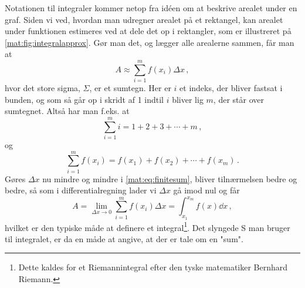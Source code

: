 Notationen til integraler kommer netop fra idéen om at beskrive arealet under en graf.
Siden vi ved, hvordan man udregner arealet på et rektangel, kan arealet under funktionen estimeres ved at dele det op i rektangler, som er illustreret på \cref{mat:fig:integralapprox}.
Gør man det, og lægger alle arealerne sammen, får man at
\begin{equation} \label{mat:eq:finitesum}
    A\approx \sum_{i=1}^mf(x_i)\Delta x \, ,
\end{equation}
hvor det store sigma, $\Sigma$, er et sumtegn. Her er $i$ et indeks, der bliver fastsat i bunden, og som så går op i skridt af 1 indtil $i$ bliver lig $m$, der står over sumtegnet. Altså har man f.eks. at
\begin{equation}
\sum_{i=1}^m i = 1+2+3+\cdots+m \,  ,    
\end{equation}
og
\begin{equation}
\sum_{i=1}^m f(x_i) = f(x_1)+f(x_2)+\cdots+f(x_m) \, .
\end{equation}
Gøres $\Delta x$ nu mindre og mindre i \cref{mat:eq:finitesum}, bliver tilnærmelsen bedre og bedre, så som i differentialregning lader vi $\Delta x$ gå imod nul og får
\begin{equation}
    A=\lim_{\Delta x\rightarrow 0}\sum_{i=1}^m f(x_i)\Delta x=\int_{x_1}^{x_m}f(x)\dd{x} \, ,
\end{equation}
hvilket er den typiske måde at definere et integral\footnote{Dette kaldes for et Riemannintegral efter den tyske matematiker Bernhard Riemann.}. Det slyngede S man bruger til integralet, er da en måde at angive, at der er tale om en "sum".






